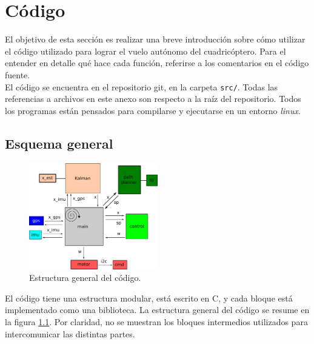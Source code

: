 \documentclass[main]{subfiles}
\begin{document}
\chapter{Código}
\label{chap:codigo}

El objetivo de esta sección es realizar una breve introducción sobre cómo utilizar el código utilizado para lograr el vuelo autónomo del cuadricóptero. Para el entender en detalle qué hace cada función, referirse a los comentarios en el código fuente.\\

El código se encuentra en el repositorio git, en la carpeta \verb+src/+. Todas las referencias a archivos en este anexo son respecto a la raíz del repositorio. Todos los programas están pensados para compilarse y ejecutarse en un entorno \emph{linux}.

\section{Esquema general}
\label{sec:codigo:esquema-general}

\begin{figure}
\vspace{-20pt}
\centering
  \includegraphics[width=0.5\textwidth]{./pics_codigo/code.png}
\caption{Estructura general del código.}
\vspace{-20pt}
\label{fig:codigo:code.png}
\end{figure}

El código tiene una estructura modular, está escrito en C, y cada bloque está implementado como una biblioteca. La estructura general del código se resume en la figura \ref{fig:codigo:code.png}. Por claridad, no se muestran los bloques intermedios utilizados para intercomunicar las distintas partes.\\
\end{document}
